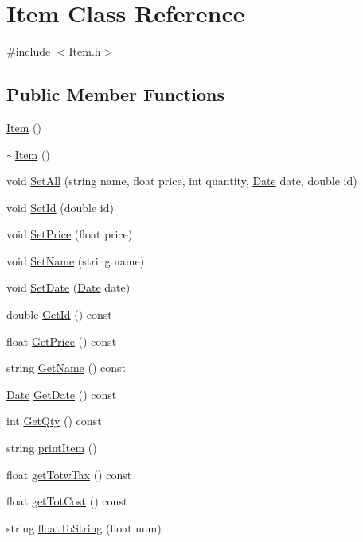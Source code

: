 \hypertarget{class_item}{}\section{Item Class Reference}
\label{class_item}


{\ttfamily \#include $<$Item.\+h$>$}

\subsection*{Public Member Functions}
\begin{DoxyCompactItemize}
\item 
\hyperlink{class_item_a297720c02984eab37332ae795d22189d}{Item} ()
\item 
\hyperlink{class_item_a11663c84075b78c3ae5e30fdfcd7c458}{$\sim$\+Item} ()
\item 
void \hyperlink{class_item_a37cea294b2195e0008e21ed6c14698d3}{Set\+All} (string name, float price, int quantity, \hyperlink{class_date}{Date} date, double id)
\item 
void \hyperlink{class_item_a9d869e03314452db6373e898fc4ac8a2}{Set\+Id} (double id)
\item 
void \hyperlink{class_item_a32e6b9bf96fff36e0ee75be2a63bc7c0}{Set\+Price} (float price)
\item 
void \hyperlink{class_item_a1cd4e7afe0c7d610f40947b28b215b78}{Set\+Name} (string name)
\item 
void \hyperlink{class_item_a79173714d6f0701fe901958cee6d0960}{Set\+Date} (\hyperlink{class_date}{Date} date)
\item 
double \hyperlink{class_item_a5c7d2087d0615f10c00b0c0735f64063}{Get\+Id} () const 
\item 
float \hyperlink{class_item_a8a7d6ee1ceca4775726313b5fa7274a8}{Get\+Price} () const 
\item 
string \hyperlink{class_item_a73aaf0a2a84114ada4063f06512c757a}{Get\+Name} () const 
\item 
\hyperlink{class_date}{Date} \hyperlink{class_item_a0b77690919ca7dbabdc3bb331f1a3e0c}{Get\+Date} () const 
\item 
int \hyperlink{class_item_a2652bf6ff3402e3628dd41cfbb8bd648}{Get\+Qty} () const 
\item 
string \hyperlink{class_item_af613974101951c2633f238d9950ae4fd}{print\+Item} ()
\item 
float \hyperlink{class_item_a8d1d7ad78a7b716eb6c9a617acd579ab}{get\+Totw\+Tax} () const 
\item 
float \hyperlink{class_item_a81a90fef83d31217f0ff99a8cac0a16e}{get\+Tot\+Cost} () const 
\item 
string \hyperlink{class_item_ac9ef5955314e651edb5dfa4a7b66453a}{float\+To\+String} (float num)
\end{DoxyCompactItemize}
